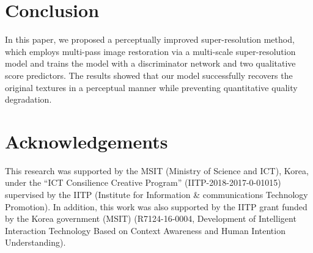 \documentclass[runningheads]{llncs}
\begin{document}
\section{Conclusion}
\label{sec:conclusion}

In this paper, we proposed a perceptually improved super-resolution method, which employs multi-pass image restoration via a multi-scale super-resolution model and trains the model with a discriminator network and two qualitative score predictors.
The results showed that our model successfully recovers the original textures in a perceptual manner while preventing quantitative quality degradation.


\section*{Acknowledgements}

This research was supported by the MSIT (Ministry of Science and ICT), Korea, under the ``ICT Consilience Creative Program'' (IITP-2018-2017-0-01015) supervised by the IITP (Institute for Information \& communications Technology Promotion). In addition, this work was also supported by the IITP grant funded by the Korea government (MSIT) (R7124-16-0004, Development of Intelligent Interaction Technology Based on Context Awareness and Human Intention Understanding).

%
%
%


%
\end{document}
